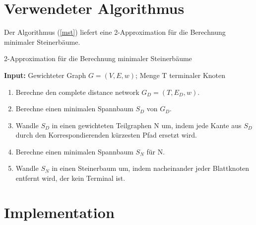 \documentclass[a4paper,10pt]{article}
\begin{document}
\section{Verwendeter Algorithmus}
\label{sec:mst}
Der Algorithmus (\ref{mst}) liefert eine 2-Approximation für die Berechnung minimaler Steinerbäume.
\begin{algorithm}
  \label{mst}
  \caption{2-Approximation für die Berechnung minimaler Steinerbäume}
      \textbf{Input: } Gewichteter Graph $G = (V,E,w)$; Menge T terminaler Knoten
      \begin{enumerate}
	\item Berechne den complete distance network $G_D = (T, E_D, w)$.
	\item Berechne einen minimalen Spannbaum $S_D$ von $G_D$.
	\item Wandle $S_D$ in einen gewichteten Teilgraphen N um, indem jede Kante aus $S_D$ durch den Korrespondierenden kürzesten Pfad ersetzt wird.
	\item Berechne einen minimalen Spannbaum $S_N$ für N.
	\item Wandle $S_N$ in einen Steinerbaum um, indem nacheinander jeder Blattknoten entfernt wird, der kein Terminal ist.
      \end{enumerate}

  \hspace{1cm}
\end{algorithm}
\hspace{1cm}


\section{Implementation}
\end{document}
